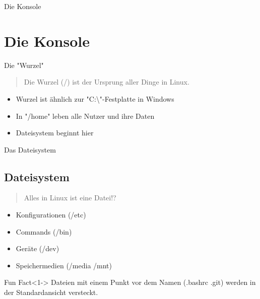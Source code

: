 
\begin{frame}{Die Konsole}
    \section{Die Konsole}\label{sec:die-konsole}
\end{frame}

\begin{frame}{Die "Wurzel"}

    \begin{quote}
        Die Wurzel (/) ist der Ursprung aller Dinge in Linux.
    \end{quote}
    \pause

    \begin{itemize}
        \item Wurzel ist ähnlich zur "C:\textbackslash"-Festplatte in Windows\pause
        \item In "/home" leben alle Nutzer und ihre Daten\pause
        \item Dateisystem beginnt hier
    \end{itemize}

\end{frame}

\begin{frame}{Das Dateisystem}
    \subsection{Dateisystem}\label{subsec:dateisystem}

    \begin{quote}
        Alles in Linux ist eine Datei!?
    \end{quote}


    \begin{itemize}
        \item<2-> Konfigurationen (/etc)
        \item<3-> Commands (/bin)
        \item<4-> Geräte (/dev)
        \item<5-> Speichermedien (/media /mnt)
    \end{itemize}

    \vspace{0.5cm}
    \begin{exampleblock}{Fun Fact}<1->
        Dateien mit einem Punkt vor dem Namen (.bashrc .git) werden in der Standardansicht versteckt.
    \end{exampleblock}
\end{frame}

